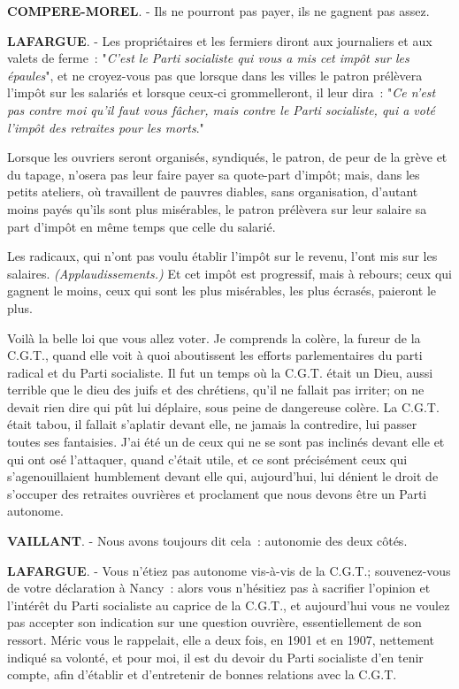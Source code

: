\documentclass[french,twoside]{book} %
\begin{document}
\textbf{COMPERE-MOREL}. - Ils ne pourront pas payer, ils ne gagnent pas assez.\par
\textbf{LAFARGUE}. - Les propriétaires et les fermiers diront aux journaliers et aux valets de ferme : "\emph{C'est le Parti socialiste qui vous a mis cet impôt sur les épaules}", et ne croyez-vous pas que lorsque dans les villes le patron prélèvera l’impôt sur les salariés et lorsque ceux-ci grommelleront, il leur dira : "\emph{Ce n’est pas contre moi qu’il faut vous fâcher, mais contre le Parti socialiste, qui a voté l’impôt des retraites pour les morts}."\par
Lorsque les ouvriers seront organisés, syndiqués, le patron, de peur de la grève et du tapage, n’osera pas leur faire payer sa quote-part d’impôt; mais, dans les petits ateliers, où travaillent de pauvres diables, sans organisation, d’autant moins payés qu’ils sont plus misérables, le patron prélèvera sur leur salaire sa part d’impôt en même temps que celle du salarié.\par
Les radicaux, qui n’ont pas voulu établir l’impôt sur le revenu, l’ont mis sur les salaires.\emph{ (Applaudissements.)} Et cet impôt est progressif, mais à rebours; ceux qui gagnent le moins, ceux qui sont les plus misérables, les plus écrasés, paieront le plus.\par
Voilà la belle loi que vous allez voter. Je comprends la colère, la fureur de la C.G.T., quand elle voit à quoi aboutissent les efforts parlementaires du parti radical et du Parti socialiste. Il fut un temps où la C.G.T. était un Dieu, aussi terrible que le dieu des juifs et des chrétiens, qu’il ne fallait pas irriter; on ne devait rien dire qui pût lui déplaire, sous peine de dangereuse colère. La C.G.T. était tabou, il fallait s’aplatir devant elle, ne jamais la contredire, lui passer toutes ses fantaisies. J'ai été un de ceux qui ne se sont pas inclinés devant elle et qui ont osé l’attaquer, quand c’était utile, et ce sont précisément ceux qui s’agenouillaient humblement devant elle qui, aujourd’hui, lui dénient le droit de s’occuper des retraites ouvrières et proclament que nous devons être un Parti autonome.\par
\textbf{VAILLANT}. - Nous avons toujours dit cela : autonomie des deux côtés.\par
\textbf{LAFARGUE}. - Vous n’étiez pas autonome vis-à-vis de la C.G.T.; souvenez-vous de votre déclaration à Nancy : alors vous n’hésitiez pas à sacrifier l’opinion et l’intérêt du Parti socialiste au caprice de la C.G.T., et aujourd’hui vous ne voulez  pas accepter son indication sur une question ouvrière, essentiellement de son ressort. Méric vous le rappelait, elle a deux fois, en 1901 et en 1907, nettement indiqué sa volonté, et pour moi, il est du devoir du Parti socialiste d’en tenir compte, afin d’établir et d’entretenir de bonnes relations avec la C.G.T.\par
\end{document}
